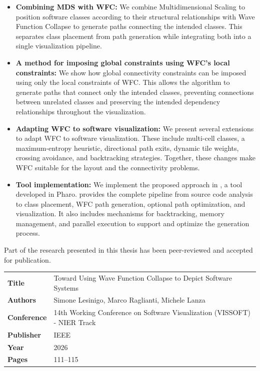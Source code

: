 \documentclass[../main.tex]{subfiles}
\begin{document}
\begin{itemize}

    \item \textbf{Combining MDS with WFC:} We combine Multidimensional Scaling to position software classes according to their structural relationships with Wave Function Collapse to generate paths connecting the intended classes. This separates class placement from path generation while integrating both into a single visualization pipeline.

    \item \textbf{A method for imposing global constraints using WFC's local constraints:} We show how global connectivity constraints can be imposed using only the local constraints of WFC. This allows the algorithm to generate paths that connect only the intended classes, preventing connections between unrelated classes and preserving the intended dependency relationships throughout the visualization.

    \item \textbf{Adapting WFC to software visualization:} We present several extensions to adapt WFC to software visualization. These include multi-cell classes, a maximum-entropy heuristic, directional path exits, dynamic tile weights, crossing avoidance, and backtracking strategies. Together, these changes make WFC suitable for the layout and the connectivity problems. 

    \item \textbf{Tool implementation:} We implement the proposed approach in \wassis, a tool developed in Pharo. \wassis provides the complete pipeline from source code analysis to class placement, WFC path generation, optional path optimization, and visualization. It also includes mechanisms for backtracking, memory management, and parallel execution to support and optimize the generation process.

\end{itemize}

\noindent Part of the research presented in this thesis has been peer-reviewed and accepted for publication. 

\begin{center}
\small
    \begin{tabular}{@{}ll@{}}
        \textbf{Title}     & Toward Using Wave Function Collapse to Depict Software Systems \\
        \textbf{Authors}   & Simone Lesinigo, Marco Raglianti, Michele Lanza \\
        \textbf{Conference}     & 14th Working Conference on Software Visualization (VISSOFT) - NIER Track \\
        \textbf{Publisher} & IEEE \\
        \textbf{Year}      & 2026 \\
        \textbf{Pages}     & 111--115 \\
    \end{tabular}
\end{center}
\end{document}
